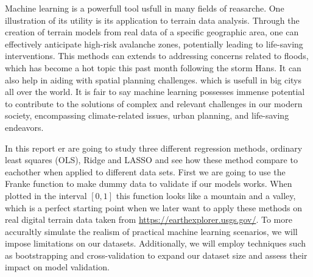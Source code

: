 \thispagestyle{plain}
\noindent Machine learning is a powerfull tool usfull in many fields of reasarche. 
One illustration of its utility is its application to terrain data analysis.
Through the creation of terrain models from real data of a specific geographic area, 
one can effectively anticipate high-risk avalanche zones\cite{WEN2022103535}, 
potentially leading to life-saving interventions. 
This methods can extends to addressing concerns related to floods, which has become 
a hot topic this past month following the storm Hans. It can also help
in aiding with spatial planning challenges. which is 
usefull in big citys all over the world. It is fair to say machine learning possesses immense potential 
to contribute to the solutions of complex and relevant challenges 
in our modern society, encompassing climate-related issues, urban planning, 
and life-saving endeavors. \newline

\noindent In this report er are going to study three different 
regression methods, ordinary least squares (OLS), 
Ridge and LASSO and see how these method compare to eachother when applied 
to different data sets. 
First we are going to use the Franke function to make dummy data to validate if 
our models works. When plotted in the interval $[0,1]$ this function looks like a mountain and a valley,
which is a perfect starting point when we later want to apply these methods 
on real digital terrain data taken from \url{https://earthexplorer.usgs.gov/}.
To more accuraltly simulate the realism of practical machine learning scenarios, 
we will impose limitations on our datasets. Additionally, we will employ
techniques such as bootstrapping and cross-validation to expand our dataset
size and assess their impact on model validation.
